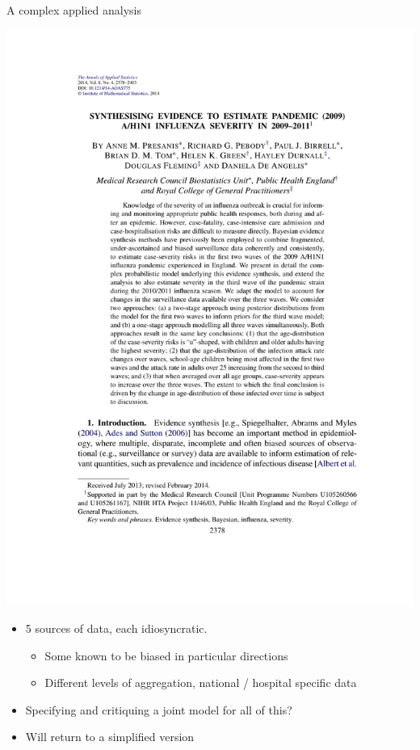 \documentclass[10pt,ignorenonframetext,]{beamer}
\providecommand{\tightlist}{%
  \setlength{\itemsep}{0pt}\setlength{\parskip}{0pt}}
\begin{document}
\begin{frame}{A complex applied analysis}

\begin{center}\includegraphics[width=1\linewidth]{figures/2014_Presanis_melding-h1n1-example} \end{center}

\begin{itemize}
\tightlist
\item
  5 sources of data, each idiosyncratic.

  \begin{itemize}
  \tightlist
  \item
    Some known to be biased in particular directions
  \item
    Different levels of aggregation, national / hospital specific data
  \end{itemize}
\item
  Specifying and critiquing a joint model for all of this?
\item
  Will return to a simplified version
\end{itemize}

\end{frame}
\end{document}
